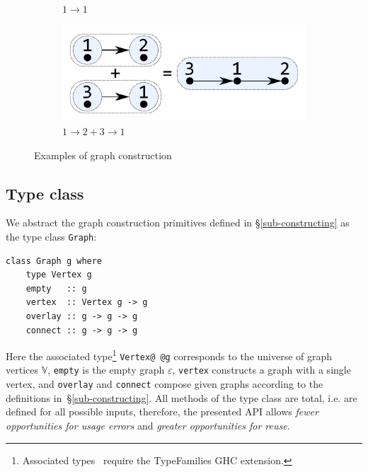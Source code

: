 \documentclass[acmlarge,anonymous]{acmart}\settopmatter{printfolios=true}
\newcommand{\hs}{\texttt}
\begin{document}
\begin{figure}
\begin{subfigure}[b]{0.15\linewidth}
\vspace{2.4mm}
\caption{$1 \rightarrow 1$}
\end{subfigure}
\hspace{12mm}
\begin{subfigure}[b]{0.2\linewidth}
\centerline{\includegraphics[scale=0.27]{fig/ex-e.pdf}}
\vspace{-1mm}
\caption{$1 \rightarrow 2 + 3 \rightarrow 1$}
\end{subfigure}
\vspace{-1mm}
\caption{Examples of graph construction\label{fig-construction}}
\vspace{-3mm}
\end{figure}

\vspace{-1mm}
\subsection{Type class}

We abstract the graph construction primitives defined in \S\ref{sub-constructing}
as the type class \hs{Graph}:

\begin{verbatim}
class Graph g where
    type Vertex g
    empty   :: g
    vertex  :: Vertex g -> g
    overlay :: g -> g -> g
    connect :: g -> g -> g
\end{verbatim}

\noindent
Here the associated type\footnote{Associated
types~\cite{2005_associated_type_chakravarty} require the \textsf{TypeFamilies}
GHC extension.} \hs{Vertex@\,@g} corresponds to the universe of graph
vertices $\mathbb{V}$, \hs{empty} is the empty graph
$\varepsilon$, \hs{vertex} constructs a graph with a single vertex,
and \hs{overlay} and \hs{connect} compose given graphs according to
the definitions in~\S\ref{sub-constructing}. All methods of the type class
are total, i.e. are defined for all possible inputs, therefore,
the presented API allows \emph{fewer opportunities for usage errors}
and \emph{greater opportunities for reuse}.
\end{document}
